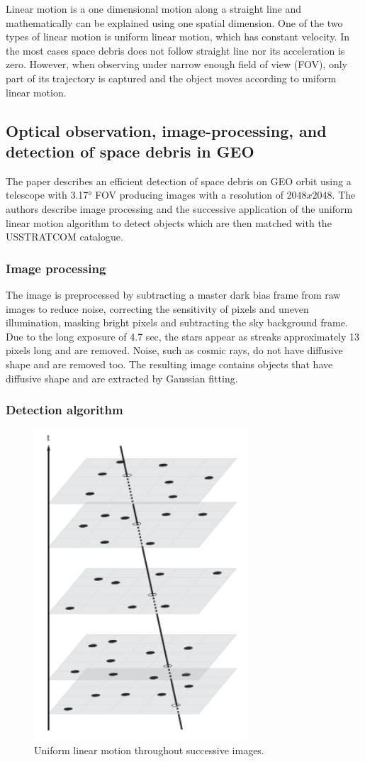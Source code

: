 	Linear motion is a one dimensional motion along a straight line and mathematically can be explained using one spatial dimension. One of the two types of linear motion is uniform linear motion, which has constant velocity. In the most cases space debris does not follow straight line nor its acceleration is zero. However, when observing under narrow enough field of view (FOV), only part of its trajectory is captured and the object moves according to uniform linear motion.

\subsection{Optical observation, image-processing, and detection of space debris in GEO}\label{subsec:linear_geo}

	The paper describes an efficient detection of space debris on GEO orbit using a telescope with 3.17° FOV producing images with a resolution of $2048 x 2048$. The authors describe image processing and the successive application of the uniform linear motion algorithm to detect objects which are then matched with the USSTRATCOM catalogue.
	
\subsubsection{Image processing}

	The image is preprocessed by subtracting a master dark bias frame from raw images to reduce noise, correcting the sensitivity of pixels and uneven illumination, masking bright pixels and subtracting the sky background frame. Due to the long exposure of 4.7 sec, the stars appear as streaks approximately 13 pixels long and are removed. Noise, such as cosmic rays, do not have diffusive shape and are removed too. The resulting image contains objects that have diffusive shape and are extracted by Gaussian fitting.
	
\subsubsection{Detection algorithm}

		

	\begin{figure}[H]
	\centering
	  \includegraphics[width=8cm]{images/uniform_linear_motion}
		  \caption{Uniform linear motion throughout successive images.}
	  \label{fig:kd_tree_time}
	\end{figure}